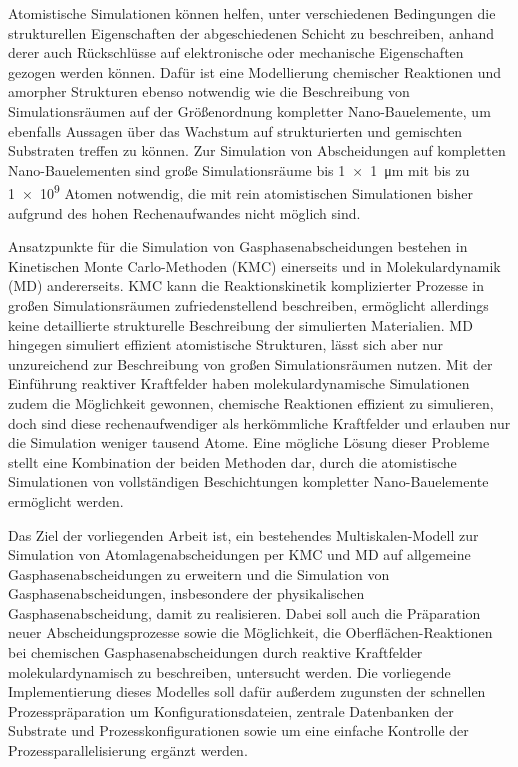 Atomistische Simulationen können helfen, unter verschiedenen Bedingungen die strukturellen Eigenschaften der abgeschiedenen Schicht zu beschreiben, anhand derer auch Rückschlüsse auf elektronische\cite{aspnes_optical_1981,steudel_influence_2004} oder mechanische Eigenschaften\cite{chasiotis_mechanical_2003,cammarata_nanoendentation_1990} gezogen werden können.
Dafür ist eine Modellierung chemischer Reaktionen und amorpher Strukturen ebenso notwendig wie die Beschreibung von Simulationsräumen auf der Größenordnung kompletter Nano-Bauelemente, um ebenfalls Aussagen über das Wachstum auf strukturierten und gemischten Substraten treffen zu können.
Zur Simulation von Abscheidungen auf kompletten Nano-Bauelementen sind große Simulationsräume bis \SI{1x1}{\micro\meter} mit bis zu \num{1e9} Atomen notwendig, die mit rein atomistischen Simulationen bisher aufgrund des hohen Rechenaufwandes nicht möglich sind\cite{plimpton_computational_1995}.

Ansatzpunkte für die Simulation von Gasphasenabscheidungen bestehen in Kinetischen Monte Carlo-Methoden (KMC)\cite{voter_introduction_2007} einerseits und in Molekulardynamik (MD)\cite{hoover_molecular_1986} andererseits.
KMC kann die Reaktionskinetik komplizierter Prozesse in großen Simulationsräumen zufriedenstellend beschreiben, ermöglicht allerdings keine detaillierte strukturelle Beschreibung der simulierten Materialien.
MD hingegen simuliert effizient atomistische Strukturen, lässt sich aber nur unzureichend zur Beschreibung von großen Simulationsräumen nutzen.
Mit der Einführung reaktiver Kraftfelder haben molekulardynamische Simulationen zudem die Möglichkeit gewonnen, chemische Reaktionen effizient zu simulieren, doch sind diese rechenaufwendiger als herkömmliche Kraftfelder und erlauben nur die Simulation weniger tausend Atome\cite{van_duin_reaxff:_2001}.
Eine mögliche Lösung dieser Probleme stellt eine Kombination der beiden Methoden dar, durch die atomistische Simulationen von vollständigen Beschichtungen kompletter Nano-Bauelemente ermöglicht werden.


Das Ziel der vorliegenden Arbeit ist, ein bestehendes Multiskalen-Modell zur Simulation von Atomlagenabscheidungen per KMC und MD auf allgemeine Gasphasenabscheidungen zu erweitern und die Simulation von Gasphasenabscheidungen, insbesondere der physikalischen Gasphasenabscheidung, damit zu realisieren.
Dabei soll auch die Präparation neuer Abscheidungsprozesse sowie die Möglichkeit, die Oberflächen-Reaktionen bei chemischen Gasphasenabscheidungen durch reaktive Kraftfelder molekulardynamisch zu beschreiben, untersucht werden.
Die vorliegende Implementierung dieses Modelles soll dafür außerdem zugunsten der schnellen Prozesspräparation um Konfigurationsdateien, zentrale Datenbanken der Substrate und Prozesskonfigurationen sowie um eine einfache Kontrolle der Prozessparallelisierung ergänzt werden.

